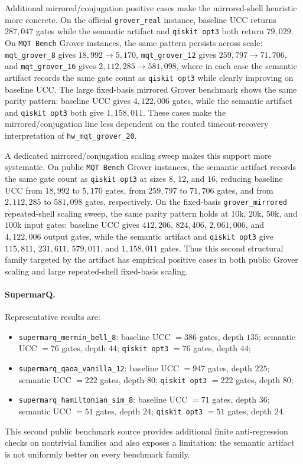 Additional mirrored/conjugation positive cases make the mirrored-shell
heuristic more concrete. On the official \texttt{grover\_real} instance,
baseline UCC returns
$287{,}047$ gates while the semantic artifact and \texttt{qiskit opt3} both return
$79{,}029$. On \texttt{MQT Bench} Grover instances, the same pattern persists
across scale: \texttt{mqt\_grover\_8} gives $18{,}992 \rightarrow 5{,}170$,
\texttt{mqt\_grover\_12} gives $259{,}797 \rightarrow 71{,}706$, and
\texttt{mqt\_grover\_16} gives $2{,}112{,}285 \rightarrow 581{,}098$, where in
each case the semantic artifact records the same gate count as
\texttt{qiskit opt3} while clearly
improving on baseline UCC.  The large fixed-basis mirrored Grover benchmark shows
the same parity pattern: baseline UCC gives $4{,}122{,}006$ gates, while
the semantic artifact and \texttt{qiskit opt3} both give $1{,}158{,}011$. These cases make the
mirrored/conjugation line less dependent on the routed timeout-recovery
interpretation of \texttt{hw\_mqt\_grover\_20}.

A dedicated mirrored/conjugation scaling sweep makes this support more
systematic. On public \texttt{MQT Bench} Grover instances, the semantic artifact
records the same gate count as \texttt{qiskit opt3} at sizes $8$, $12$, and
$16$, reducing
baseline UCC from $18{,}992$ to $5{,}170$ gates, from $259{,}797$ to $71{,}706$
gates, and from $2{,}112{,}285$ to $581{,}098$ gates, respectively. On the
fixed-basis \texttt{grover\_mirrored} repeated-shell scaling sweep, the same
parity pattern holds at $10$k, $20$k, $50$k, and $100$k input gates:
baseline UCC gives $412{,}206$, $824{,}406$, $2{,}061{,}006$, and
$4{,}122{,}006$ output gates, while the semantic artifact and \texttt{qiskit opt3}
give $115{,}811$, $231{,}611$, $579{,}011$, and $1{,}158{,}011$ gates. Thus
this second structural family targeted by the artifact has empirical positive
cases in both public Grover scaling and large repeated-shell fixed-basis
scaling.

\paragraph{SupermarQ.}
Representative results are:
\begin{itemize}[leftmargin=1.5em]
    \item \texttt{supermarq\_mermin\_bell\_8}: baseline UCC $= 386$ gates, depth $135$; semantic UCC $= 76$ gates, depth $44$; \texttt{qiskit opt3} $= 76$ gates, depth $44$;
    \item \texttt{supermarq\_qaoa\_vanilla\_12}: baseline UCC $= 947$ gates, depth $225$; semantic UCC $= 222$ gates, depth $80$; \texttt{qiskit opt3} $= 222$ gates, depth $80$;
    \item \texttt{supermarq\_hamiltonian\_sim\_8}: baseline UCC $= 71$ gates, depth $36$; semantic UCC $= 51$ gates, depth $24$; \texttt{qiskit opt3} $= 51$ gates, depth $24$.
\end{itemize}
This second public benchmark source provides additional finite anti-regression
checks on nontrivial families and also exposes a limitation: the semantic
artifact is not uniformly better on every benchmark family.



